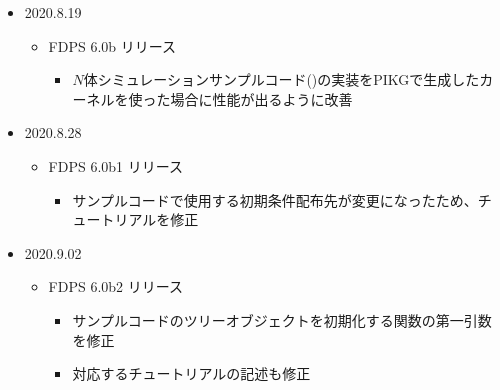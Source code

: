 \begin{itemize}[leftmargin=*,itemsep=-1ex]
\item 2020.8.19
\begin{itemize}
\item FDPS 6.0b リリース
\begin{itemize}
\item $N$体シミュレーションサンプルコード()の実装をPIKGで生成したカーネルを使った場合に性能が出るように改善
\end{itemize}
\end{itemize}

\item 2020.8.28
\begin{itemize}
\item FDPS 6.0b1 リリース
\begin{itemize}
\item サンプルコードで使用する初期条件配布先が変更になったため、チュートリアルを修正
\end{itemize}
\end{itemize}

\item 2020.9.02
\begin{itemize}
\item FDPS 6.0b2 リリース
\begin{itemize}
\item サンプルコードのツリーオブジェクトを初期化する関数の第一引数を修正
\item 対応するチュートリアルの記述も修正
\end{itemize}
\end{itemize}

\end{itemize}
